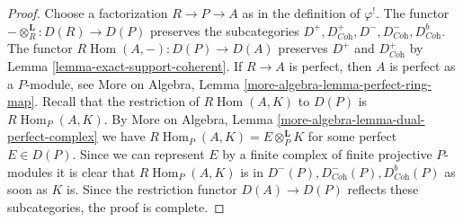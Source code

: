 \documentclass[10pt,a4paper]{amsart}
\theoremstyle{plain}
\theoremstyle{definition}
\theoremstyle{remark}
\numberwithin{equation}{subsection}
\def\Hom{\mathop{\mathrm{Hom}}\nolimits}
\begin{document}
\begin{proof}
Choose a factorization $R \to P \to A$ as in the definition of $\varphi^!$.
The functor $- \otimes_R^\mathbf{L} : D(R) \to D(P)$ preserves
the subcategories
$D^+, D^+_{\textit{Coh}}, D^-, D^-_{\textit{Coh}}, D^b_{\textit{Coh}}$.
The functor $R\Hom(A, -) : D(P) \to D(A)$
preserves $D^+$ and $D^+_{\textit{Coh}}$ by
Lemma \ref{lemma-exact-support-coherent}.
If $R \to A$ is perfect, then $A$ is perfect as a $P$-module, see
More on Algebra, Lemma \ref{more-algebra-lemma-perfect-ring-map}.
Recall that the restriction of $R\Hom(A, K)$ to $D(P)$ is
$R\Hom_P(A, K)$. By More on Algebra, Lemma
\ref{more-algebra-lemma-dual-perfect-complex}
we have $R\Hom_P(A, K) = E \otimes_P^\mathbf{L} K$ for
some perfect $E \in D(P)$. Since we can represent $E$ by
a finite complex of finite projective $P$-modules
it is clear that $R\Hom_P(A, K)$ is in
$D^-(P), D^-_{\textit{Coh}}(P), D^b_{\textit{Coh}}(P)$
as soon as $K$ is. Since the restriction functor
$D(A) \to D(P)$ reflects these subcategories, the
proof is complete.
\end{proof}
\end{document}

